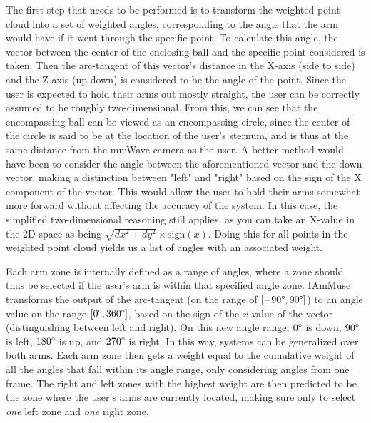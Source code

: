 The first step that needs to be performed is to transform the weighted point cloud into a set of weighted angles, corresponding to the angle that the arm would have if it went through the specific point.
To calculate this angle, the vector between the center of the enclosing ball and the specific point considered is taken.
Then the arc-tangent of this vector's distance in the X-axis (side to side) and the Z-axis (up-down) is considered to be the angle of the point.
Since the user is expected to hold their arms out mostly straight, the user can be correctly assumed to be roughly two-dimensional.
From this, we can see that the encompassing ball can be viewed as an encompassing circle, since the center of the circle is said to be at the location of the user's sternum, and is thus at the same distance from the mmWave camera as the user.
A better method would have been to consider the angle between the aforementioned vector and the down vector, making a distinction between "left" and "right" based on the sign of the X component of the vector.
This would allow the user to hold their arms somewhat more forward without affecting the accuracy of the system.
In this case, the simplified two-dimensional reasoning still applies, as you can take an X-value in the 2D space as being $\sqrt{dx^2 + dy^2} \times \text{sign}(x)$.
Doing this for all points in the weighted point cloud yields us a list of angles with an associated weight.

Each arm zone is internally defined as a range of angles, where a zone should thus be selected if the user's arm is within that specified angle zone.
IAmMuse transforms the output of the arc-tangent (on the range of $[-90\degree, 90\degree]$) to an angle value on the range $[0\degree, 360\degree]$, based on the sign of the $x$ value of the vector (distinguishing between left and right).
On this new angle range, $0\degree$ is down, $90\degree$ is left, $180\degree$ is up, and $270\degree$ is right. 
In this way, systems can be generalized over both arms.
Each arm zone then gets a weight equal to the cumulative weight of all the angles that fall within its angle range, only considering angles from one frame.
The right and left zones with the highest weight are then predicted to be the zone where the user's arms are currently located, making sure only to select \textit{one} left zone and \textit{one} right zone.

